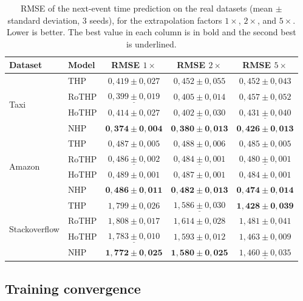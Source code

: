 \begin{table}[h!]
\centering
\caption{RMSE of the next-event time prediction on the real datasets (mean $\pm$ standard deviation, 3 seeds), for the extrapolation factors $1\times$, $2\times$, and $5\times$. Lower is better. The best value in each column is in bold and the second best is underlined.}
\label{tab:rmse-reais}
\begin{tabular}{llccc}
\toprule
Dataset & Model & RMSE $1\times$ & RMSE $2\times$ & RMSE $5\times$ \\
\midrule
\multirow{4}{*}{Taxi}
    & THP    & $0,419 \pm 0,027$ & $0,452 \pm 0,055$ & $0,452 \pm 0,043$ \\
    & RoTHP  & $\underline{0,399 \pm 0,019}$ & $0,405 \pm 0,014$ & $0,457 \pm 0,052$ \\
    & HoTHP  & $0,414 \pm 0,027$ & $\underline{0,402 \pm 0,030}$ & $\underline{0,431 \pm 0,040}$ \\
    & NHP    & $\mathbf{0,374 \pm 0,004}$ & $\mathbf{0,380 \pm 0,013}$ & $\mathbf{0,426 \pm 0,013}$ \\
\midrule
\multirow{4}{*}{Amazon}
    & THP    & $0,487 \pm 0,005$ & $0,488 \pm 0,006$ & $0,485 \pm 0,005$ \\
    & RoTHP  & $\underline{0,486 \pm 0,002}$ & $\underline{0,484 \pm 0,001}$ & $\underline{0,480 \pm 0,001}$ \\
    & HoTHP  & $0,489 \pm 0,001$ & $0,487 \pm 0,001$ & $0,484 \pm 0,001$ \\
    & NHP    & $\mathbf{0,486 \pm 0,011}$ & $\mathbf{0,482 \pm 0,013}$ & $\mathbf{0,474 \pm 0,014}$ \\
\midrule
\multirow{4}{*}{Stackoverflow}
    & THP    & $1,799 \pm 0,026$ & $\underline{1,586 \pm 0,030}$ & $\mathbf{1,428 \pm 0,039}$ \\
    & RoTHP  & $1,808 \pm 0,017$ & $1,614 \pm 0,028$ & $1,481 \pm 0,041$ \\
    & HoTHP  & $\underline{1,783 \pm 0,010}$ & $1,593 \pm 0,012$ & $1,463 \pm 0,009$ \\
    & NHP    & $\mathbf{1,772 \pm 0,025}$ & $\mathbf{1,580 \pm 0,025}$ & $\underline{1,460 \pm 0,035}$ \\
\bottomrule
\end{tabular}
\end{table}

\subsection{Training convergence}
\label{subsec:convergencia}

